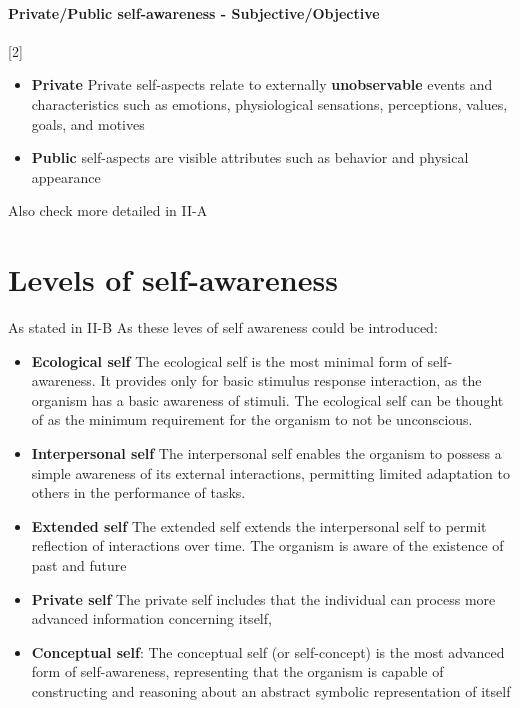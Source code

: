 \documentclass{article}
\begin{document}
		\paragraph{Private/Public self-awareness - Subjective/Objective}  \citet{regazzoni-2020-multi-sensorial-generative-and-descriptive-self-awareness-models-for-autonomous-systems}[2]
			\begin{itemize}
				\item \textbf{Private} Private self-aspects relate to externally \textbf{unobservable} events and characteristics such as
				emotions, physiological sensations, perceptions, values, goals, and motives
				\item \textbf{Public} self-aspects are visible attributes such as behavior and physical appearance
			\end{itemize}
			Also check more detailed in \cite{lewis-2011-a-survey-of-self-awareness-and-its-application-in-computing-systems} II-A
		\section{Levels of self-awareness}
			As stated in
			\cite{lewis-2011-a-survey-of-self-awareness-and-its-application-in-computing-systems} II-B
			As \citet{neisser-1997-the-roots-of-self-knowledge-perceiving-self-it-and-thou} these leves of self awareness could be introduced:
			\begin{itemize}
				\item \textbf{Ecological self} The ecological self is the most minimal form of
				self-awareness. It provides only for basic stimulus	response interaction, as the organism has a basic
				awareness of stimuli. The ecological self can be
				thought of as the minimum requirement for the organism to not be unconscious.
				
				\item \textbf{Interpersonal self} The interpersonal self enables the organism to possess
				a simple awareness of its external interactions, permitting limited adaptation to others in the performance of
				tasks.
				
				\item \textbf{Extended self}
				The extended self extends the interpersonal self to
				permit reflection of interactions over time. The organism is aware of the existence of past and future
				
				\item \textbf{Private self}
				The private self includes that the individual can process more advanced information concerning itself,
				
				\item \textbf{Conceptual self}: The conceptual self (or self-concept) is the most
				advanced form of self-awareness, representing that
				the organism is capable of constructing and reasoning
				about an abstract symbolic representation of itself
			\end{itemize}
\end{document}
